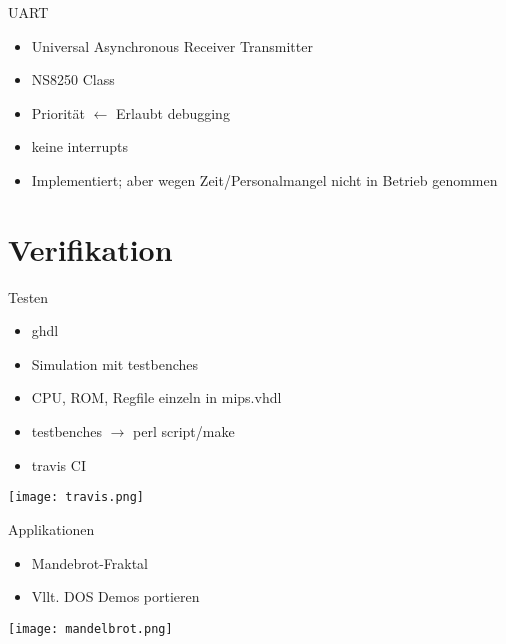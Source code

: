 \begin{frame}{UART}

\begin{itemize}
	\item Universal Asynchronous Receiver Transmitter
	\item NS8250 Class 
	\item Priorität $\leftarrow$ Erlaubt debugging
	\item keine interrupts
	\pause
	\item Implementiert; aber wegen Zeit/Personalmangel nicht in Betrieb genommen
\end{itemize}
\begin{center}
\end{center}
	\end{frame}


\section{Verifikation}

\begin{frame}{Testen}
\begin{itemize}
    \item ghdl
    \item Simulation mit testbenches
	\item CPU, ROM, Regfile einzeln in mips.vhdl
	\item testbenches $\rightarrow$ perl script/make
	\item travis CI
\end{itemize}
\begin{center}
\texttt{[image: travis.png]}
\end{center}

\end{frame}


\begin{frame}{Applikationen}
\begin{itemize}
\item Mandebrot-Fraktal
\item Vllt. DOS Demos portieren
\end{itemize}

\begin{center}
\texttt{[image: mandelbrot.png]}
\end{center}


\end{frame}

